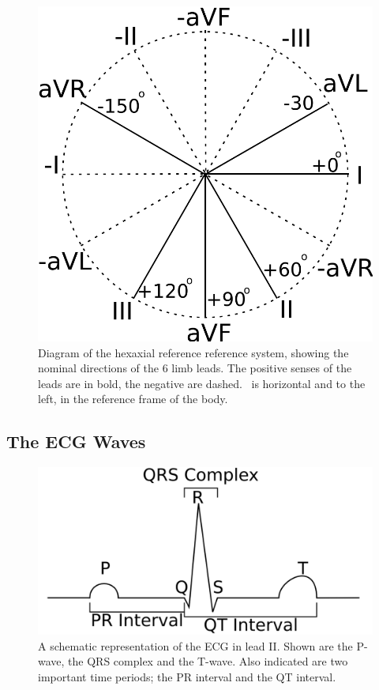 \begin{figure}
\begin{center}
\includegraphics{figures/intro/hexaxial}
\end{center}
\caption[Hexaxial Reference System]{
\label{fig:intro:ecg:hex}
Diagram of the hexaxial reference reference system, showing the nominal
directions of the 6 limb leads.
The positive senses of the leads are in bold, the negative are dashed.
\ is horizontal and to the left, in the reference frame of the body.
}
\end{figure}

\subsection{The ECG Waves}

\begin{figure}
\begin{center}
\includegraphics{figures/intro/schematic_ecg}
\end{center}
\caption[Schematic ECG]{
\label{fig:intro:ecg:schematic}
A schematic representation of the ECG in lead II.
Shown are the P-wave, the QRS complex and the T-wave.
Also indicated are two important time periods; the PR interval and the QT
interval.
}
\end{figure}


